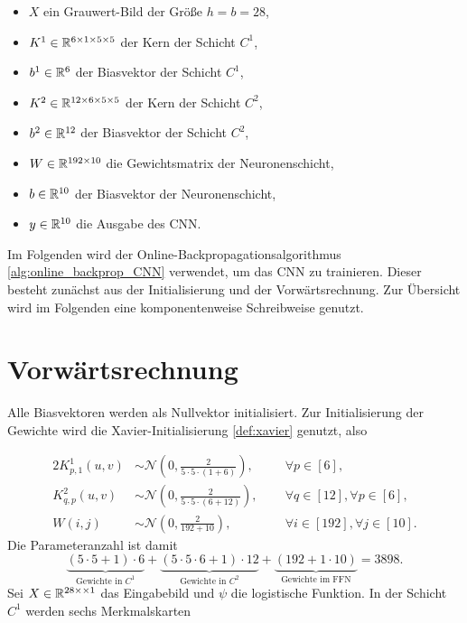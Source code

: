 \begin{itemize}
    \item $X$ ein Grauwert-Bild der Größe $h=b=28$,
    \item $K^1 \in \mathbb{R}^{6 \times 1 \times 5 \times 5}$ der Kern der Schicht $C^1$,
    \item $b^1 \in \mathbb{R}^6$ der Biasvektor der Schicht $C^1$,
    \item $K^2 \in \mathbb{R}^{12 \times 6 \times 5 \times 5}$ der Kern der Schicht $C^2$,
    \item $b^2 \in \mathbb{R}^{12}$ der Biasvektor der Schicht $C^2$,
    \item $W \in \mathbb{R}^{192 \times 10}$ die Gewichtsmatrix der Neuronenschicht,
    \item $b \in \mathbb{R}^{10}$ der Biasvektor der Neuronenschicht,
    \item $y \in \mathbb{R}^{10}$ die Ausgabe des CNN. 
\end{itemize}

Im Folgenden wird der Online-Backpropagationsalgorithmus \ref{alg:online_backprop_CNN} verwendet, um das CNN zu trainieren. Dieser besteht zunächst aus der Initialisierung und der Vorwärtsrechnung. Zur Übersicht wird im Folgenden eine komponentenweise Schreibweise genutzt.

\section*{Vorwärtsrechnung}

Alle Biasvektoren werden als Nullvektor initialisiert. Zur Initialisierung der Gewichte wird die Xavier-Initialisierung \ref{def:xavier} genutzt, also

\begin{alignat*}{2}
    K^{1}_{p,1}(u,v) &\sim  \mathcal{N} \left(0, \frac{2}{5 \cdot 5 \cdot (1+6)}\right), \; \; && \forall p \in [6],\\
    K^{2}_{q,p}(u,v) &\sim  \mathcal{N} \left(0, \frac{2}{5 \cdot 5 \cdot (6+12)}\right),\; \; && \forall q \in [12], \forall p \in [6],\\
    W(i,j) &\sim \mathcal{N} \left(0, \frac{2}{192+10}\right), \; \; &&\forall i \in [192], \forall j \in [10].
\end{alignat*}
Die Parameteranzahl ist damit 
\begin{equation*}
    \underbrace{(5 \cdot 5 +1) \cdot 6}_{\text{Gewichte in $C^1$}}+\underbrace{(5 \cdot 5 \cdot 6+1) \cdot 12}_{\text{Gewichte in $C^2$}}+\underbrace{(192+1 \cdot 10)}_{\text{Gewichte im FFN}}=3898.
\end{equation*}
 Sei $X \in \mathbb{R}^{28 \times \times 1}$ das Eingabebild und $\psi$ die logistische Funktion. In der Schicht $C^1$ werden sechs Merkmalskarten 

